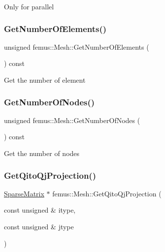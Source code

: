Only for parallel \mbox{\label{classfemus_1_1_mesh_ab5bcfd4be738d47ae025a06eddc66f61}} 
\subsubsection{\texorpdfstring{Get\+Number\+Of\+Elements()}{GetNumberOfElements()}}
{\footnotesize\ttfamily unsigned femus\+::\+Mesh\+::\+Get\+Number\+Of\+Elements (\begin{DoxyParamCaption}{ }\end{DoxyParamCaption}) const\hspace{0.3cm}{\ttfamily [inline]}}

Get the number of element \mbox{\label{classfemus_1_1_mesh_af2c24133f4e09b566e6d92bcc3a417c3}} 
\subsubsection{\texorpdfstring{Get\+Number\+Of\+Nodes()}{GetNumberOfNodes()}}
{\footnotesize\ttfamily unsigned femus\+::\+Mesh\+::\+Get\+Number\+Of\+Nodes (\begin{DoxyParamCaption}{ }\end{DoxyParamCaption}) const\hspace{0.3cm}{\ttfamily [inline]}}

Get the number of nodes \mbox{\label{classfemus_1_1_mesh_a22a9673979ad78c09d562d9bb413cdde}} 
\subsubsection{\texorpdfstring{Get\+Qito\+Qj\+Projection()}{GetQitoQjProjection()}}
{\footnotesize\ttfamily \mbox{\hyperlink{classfemus_1_1_sparse_matrix}{Sparse\+Matrix}} $\ast$ femus\+::\+Mesh\+::\+Get\+Qito\+Qj\+Projection (\begin{DoxyParamCaption}\item[{const unsigned \&}]{itype,  }\item[{const unsigned \&}]{jtype }\end{DoxyParamCaption})}

